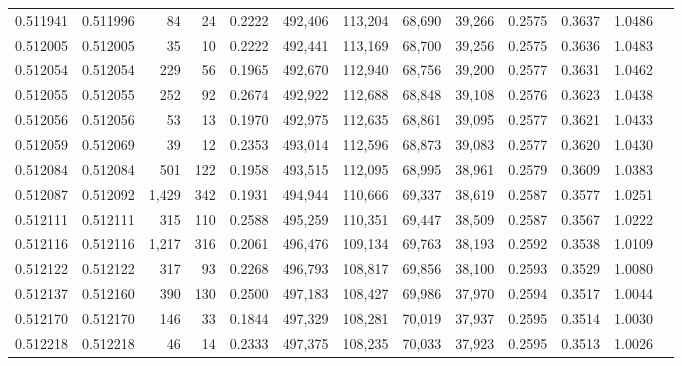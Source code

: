 \begin{tabular}{rrrrrrrrrrrrr}
0.511941 & 0.511996 &    84 &    24 &                                     0.2222 & 492,406 & 113,204 &  68,690 &  39,266 & 0.2575 & 0.3637 & 1.0486 \\
0.512005 & 0.512005 &    35 &    10 &                                     0.2222 & 492,441 & 113,169 &  68,700 &  39,256 & 0.2575 & 0.3636 & 1.0483 \\
0.512054 & 0.512054 &   229 &    56 &                                     0.1965 & 492,670 & 112,940 &  68,756 &  39,200 & 0.2577 & 0.3631 & 1.0462 \\
0.512055 & 0.512055 &   252 &    92 &                                     0.2674 & 492,922 & 112,688 &  68,848 &  39,108 & 0.2576 & 0.3623 & 1.0438 \\
0.512056 & 0.512056 &    53 &    13 &                                     0.1970 & 492,975 & 112,635 &  68,861 &  39,095 & 0.2577 & 0.3621 & 1.0433 \\
0.512059 & 0.512069 &    39 &    12 &                                     0.2353 & 493,014 & 112,596 &  68,873 &  39,083 & 0.2577 & 0.3620 & 1.0430 \\
0.512084 & 0.512084 &   501 &   122 &                                     0.1958 & 493,515 & 112,095 &  68,995 &  38,961 & 0.2579 & 0.3609 & 1.0383 \\
0.512087 & 0.512092 & 1,429 &   342 &                                     0.1931 & 494,944 & 110,666 &  69,337 &  38,619 & 0.2587 & 0.3577 & 1.0251 \\
0.512111 & 0.512111 &   315 &   110 &                                     0.2588 & 495,259 & 110,351 &  69,447 &  38,509 & 0.2587 & 0.3567 & 1.0222 \\
0.512116 & 0.512116 & 1,217 &   316 &                                     0.2061 & 496,476 & 109,134 &  69,763 &  38,193 & 0.2592 & 0.3538 & 1.0109 \\
0.512122 & 0.512122 &   317 &    93 &                                     0.2268 & 496,793 & 108,817 &  69,856 &  38,100 & 0.2593 & 0.3529 & 1.0080 \\
0.512137 & 0.512160 &   390 &   130 &                                     0.2500 & 497,183 & 108,427 &  69,986 &  37,970 & 0.2594 & 0.3517 & 1.0044 \\
0.512170 & 0.512170 &   146 &    33 &                                     0.1844 & 497,329 & 108,281 &  70,019 &  37,937 & 0.2595 & 0.3514 & 1.0030 \\
0.512218 & 0.512218 &    46 &    14 &                                     0.2333 & 497,375 & 108,235 &  70,033 &  37,923 & 0.2595 & 0.3513 & 1.0026 \\

\end{tabular}
